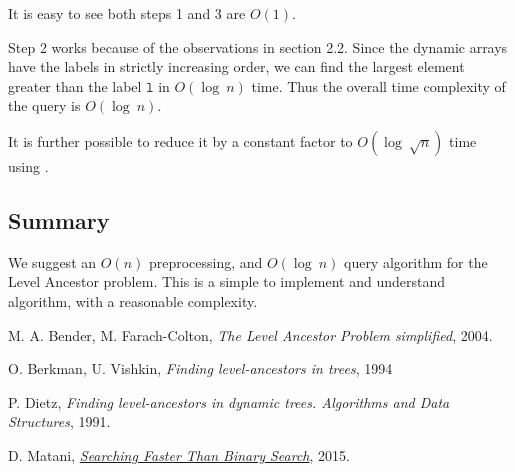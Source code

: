 \documentclass[10pt]{article}
\begin{document}
It is easy to see both steps 1 and 3 are $O(1)$.

Step 2 works because of the observations in section 2.2. Since the dynamic arrays have the labels in strictly increasing order, we can find the largest element greater than the label $\mathtt{l}$ in $O(\log\ {n})$ time. Thus the overall time complexity of the query is $O(\log\ {n})$.

It is further possible to reduce it by a constant factor to $O(\log\ {\sqrt{n}})$ time using \cite{DhruvFastBinarySearch}.

\subsection{Summary}
We suggest an $O(n)$ preprocessing, and $O(\log\ {n})$ query algorithm for the Level Ancestor problem. This is a simple to implement and understand algorithm, with a reasonable complexity.

\begin{thebibliography}{9}
M. A. Bender, M. Farach-Colton, \textit{The Level Ancestor Problem simplified}, 2004.

O. Berkman, U. Vishkin, \textit{Finding level-ancestors in trees}, 1994

P. Dietz, \textit{Finding level-ancestors in dynamic trees. Algorithms and Data Structures}, 1991. 

D. Matani, \href{http://dhruvbird.blogspot.com/2015/02/searching-faster-than-binary-search.html}{\textit{Searching Faster Than Binary Search}}, 2015.

\end{thebibliography}
\end{document}
